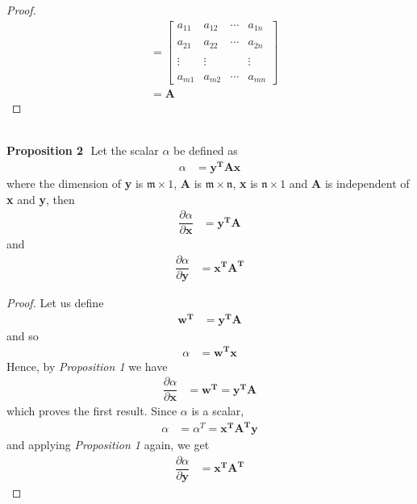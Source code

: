\documentclass[14pt]{extarticle}
\begin{document}
\begin{flushleft}
\begin{large}
\begin{proof}
\begin{align}
&= \begin{bmatrix}
\mathit{a}_\mathit{11} & \mathit{a}_\mathit{12} & \cdots & \mathit{a}_\mathit{1n}\\\\
\mathit{a}_\mathit{21} & \mathit{a}_\mathit{22} & \cdots & \mathit{a}_\mathit{2n}\\\\
\vdots & \vdots & &\vdots\\\\
\mathit{a}_\mathit{m1} & \mathit{a}_\mathit{m2} & \cdots & \mathit{a}_\mathit{mn}
\end{bmatrix}\\
&= \mathbf{A}
\end{align}
\end{proof}
\\
\hfill \break
\hfill \break
\textbf{Proposition 2} \,\,Let the scalar $\alpha$ be defined as
\begin{align}
\alpha &= \mathbf{y^TAx}
\end{align}
where the dimension of \textbf{y} is $\mathfrak{m} \times 1$, \textbf{A} is $\mathfrak{m} \times \mathfrak{n}$, \textbf{x} is $\mathfrak{n} \times 1$ and \textbf{A} is independent of \textbf{x} and \textbf{y}, then
\begin{align}
\dfrac{\partial \alpha}{\partial \mathbf{x}} &= \mathbf{y^TA}
\end{align}
and
\begin{align}
\dfrac{\partial \alpha}{\partial \mathbf{y}} &= \mathbf{x^TA^T}
\end{align}
\begin{proof}
Let us define
\begin{align}
\mathbf{w^T} &= \mathbf{y^TA}
\end{align}
and so
\begin{align}
\alpha &= \mathbf{w^Tx}
\end{align}
Hence, by \emph{Proposition 1} we have
\begin{align}
\dfrac{\partial \alpha}{\partial \mathbf{x}} &= \mathbf{w^T} = \mathbf{y^TA}
\end{align} 
which proves the first result. Since $\alpha$ is a scalar,
\begin{align}
\alpha &= \alpha^T = \mathbf{x^TA^Ty}
\end{align}
and applying \emph{Proposition 1} again, we get
\begin{align}
\dfrac{\partial \alpha}{\partial \mathbf{y}} &= \mathbf{x^TA^T}

\end{align}
\end{proof}
\end{large}
\end{flushleft}
\end{document}
